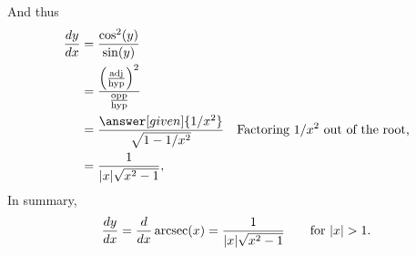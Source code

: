 \documentclass{ximera}
\begin{document}
\begin{theorem}
\begin{explanation}
    And thus
%
%          
%
\begin{align*}
\frac{dy}{dx}&= \frac{\cos^2(y)}{\sin(y)}\\
  &= \frac{
    \left(\frac{\mathrm{adj}}{\mathrm{hyp}}\right)^2}{\frac{\mathrm{opp}}{\mathrm{hyp}}}\\
  &= \frac{\answer[given]{1/x^2}}{\sqrt{1-1/x^2}}&\text{Factoring $1/x^2$ out of the root,}\\
  &= \frac{1}{|x|\sqrt{x^2-1}},
\end{align*}
In summary,
\[
\frac{dy}{dx}= \frac{d}{dx} \arcsec(x) = \frac{1}{|x|\sqrt{x^2-1}}\qquad\text{for $|x|>1$}. 
\]
\end{explanation}
\end{theorem}
\end{document}

